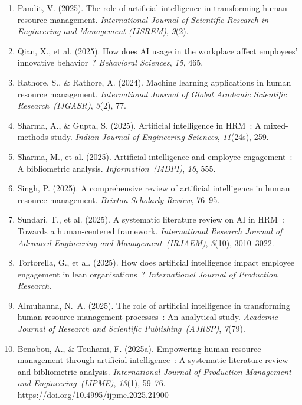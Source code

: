 \documentclass[12pt,a4paper]{article}
\begin{document}
\begin{enumerate}
\item Pandit, V. (2025). The role of artificial intelligence in transforming human
  resource management. \textit{International Journal of Scientific Research in
  Engineering and Management (IJSREM)}, \textit{9}(2).

\item Qian, X., et al. (2025). How does AI usage in the workplace affect employees'
  innovative behavior~? \textit{Behavioral Sciences}, \textit{15}, 465.

\item Rathore, S., \& Rathore, A. (2024). Machine learning applications in human
  resource management. \textit{International Journal of Global Academic Scientific
  Research~(IJGASR)}, \textit{3}(2), 77.

\item Sharma, A., \& Gupta, S. (2025). Artificial intelligence in HRM~: A mixed-methods
  study. \textit{Indian Journal of Engineering Sciences}, \textit{11}(24s), 259.

\item Sharma, M., et al. (2025). Artificial intelligence and employee engagement~: A
  bibliometric analysis. \textit{Information~(MDPI)}, \textit{16}, 555.

\item Singh, P. (2025). A comprehensive review of artificial intelligence in human
  resource management. \textit{Brixton Scholarly Review}, 76--95.

\item Sundari, T., et al. (2025). A systematic literature review on AI in HRM~: Towards
  a human-centered framework. \textit{International Research Journal of Advanced
  Engineering and Management~(IRJAEM)}, \textit{3}(10), 3010--3022.

\item Tortorella, G., et al. (2025). How does artificial intelligence impact employee
  engagement in lean organisations~? \textit{International Journal of Production
  Research}.


\item Almuhanna, N.~A. (2025). The role of artificial intelligence in transforming
  human resource management processes~: An analytical study. \textit{Academic Journal
  of Research and Scientific Publishing~(AJRSP)}, \textit{7}(79).

\item Benabou, A., \& Touhami, F. (2025a). Empowering human resource management through
  artificial intelligence~: A systematic literature review and bibliometric analysis.
  \textit{International Journal of Production Management and Engineering~(IJPME)},
  \textit{13}(1), 59--76.
  \url{https://doi.org/10.4995/ijpme.2025.21900}


\end{enumerate}
\end{document}

